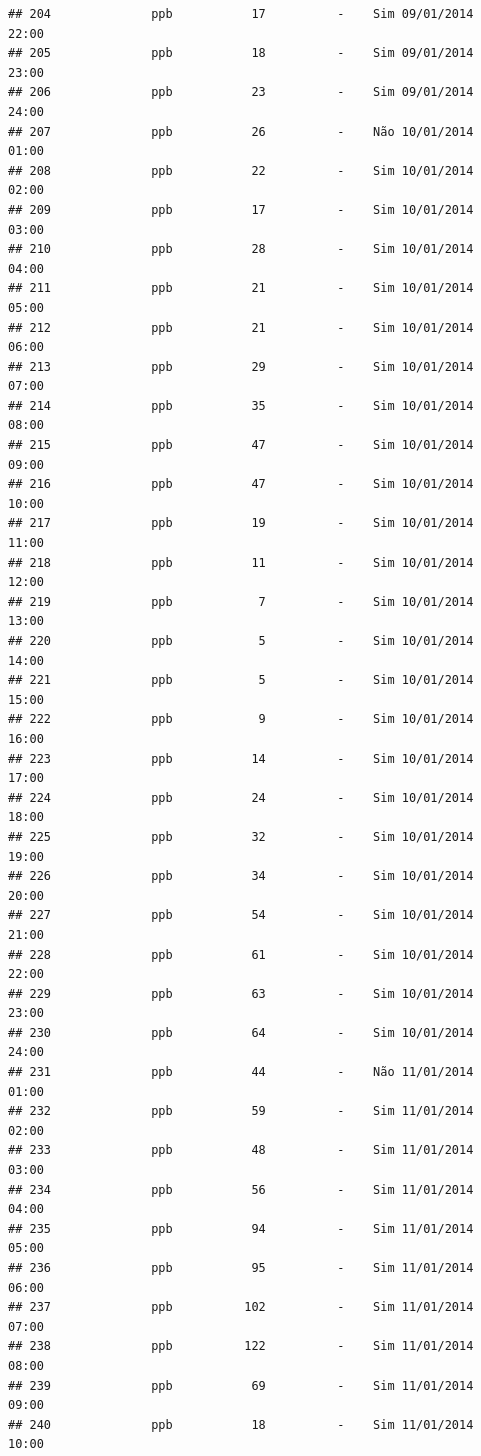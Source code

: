 \documentclass[]{book}
\begin{document}
\begin{verbatim}
## 204              ppb           17          -    Sim 09/01/2014 22:00
## 205              ppb           18          -    Sim 09/01/2014 23:00
## 206              ppb           23          -    Sim 09/01/2014 24:00
## 207              ppb           26          -    Não 10/01/2014 01:00
## 208              ppb           22          -    Sim 10/01/2014 02:00
## 209              ppb           17          -    Sim 10/01/2014 03:00
## 210              ppb           28          -    Sim 10/01/2014 04:00
## 211              ppb           21          -    Sim 10/01/2014 05:00
## 212              ppb           21          -    Sim 10/01/2014 06:00
## 213              ppb           29          -    Sim 10/01/2014 07:00
## 214              ppb           35          -    Sim 10/01/2014 08:00
## 215              ppb           47          -    Sim 10/01/2014 09:00
## 216              ppb           47          -    Sim 10/01/2014 10:00
## 217              ppb           19          -    Sim 10/01/2014 11:00
## 218              ppb           11          -    Sim 10/01/2014 12:00
## 219              ppb            7          -    Sim 10/01/2014 13:00
## 220              ppb            5          -    Sim 10/01/2014 14:00
## 221              ppb            5          -    Sim 10/01/2014 15:00
## 222              ppb            9          -    Sim 10/01/2014 16:00
## 223              ppb           14          -    Sim 10/01/2014 17:00
## 224              ppb           24          -    Sim 10/01/2014 18:00
## 225              ppb           32          -    Sim 10/01/2014 19:00
## 226              ppb           34          -    Sim 10/01/2014 20:00
## 227              ppb           54          -    Sim 10/01/2014 21:00
## 228              ppb           61          -    Sim 10/01/2014 22:00
## 229              ppb           63          -    Sim 10/01/2014 23:00
## 230              ppb           64          -    Sim 10/01/2014 24:00
## 231              ppb           44          -    Não 11/01/2014 01:00
## 232              ppb           59          -    Sim 11/01/2014 02:00
## 233              ppb           48          -    Sim 11/01/2014 03:00
## 234              ppb           56          -    Sim 11/01/2014 04:00
## 235              ppb           94          -    Sim 11/01/2014 05:00
## 236              ppb           95          -    Sim 11/01/2014 06:00
## 237              ppb          102          -    Sim 11/01/2014 07:00
## 238              ppb          122          -    Sim 11/01/2014 08:00
## 239              ppb           69          -    Sim 11/01/2014 09:00
## 240              ppb           18          -    Sim 11/01/2014 10:00

\end{verbatim}
\end{document}
